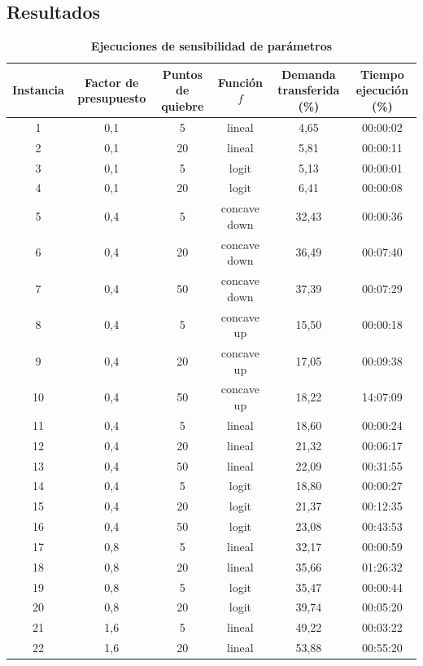 \documentclass{article}
\begin{document}
  \subsection{Resultados}

  \begin{table}
    \centering
    \caption*{{\bf Ejecuciones de sensibilidad de parámetros}}
    \begin{tabular}{cccccc}
        \toprule
        Instancia & Factor de presupuesto & Puntos de quiebre & Función $f$ & Demanda transferida (\%) & Tiempo ejecución (\%) \\
        \midrule
        1 & 0,1 & 5 & lineal & 4,65 & 00:00:02 \\
        2 & 0,1 & 20 & lineal & 5,81 & 00:00:11 \\
        3 & 0,1 & 5 & logit & 5,13 & 00:00:01 \\
        4 & 0,1 & 20 & logit & 6,41 & 00:00:08 \\
        5 & 0,4 & 5 & concave down & 32,43 & 00:00:36 \\
        6 & 0,4 & 20 & concave down & 36,49 & 00:07:40 \\
        7 & 0,4 & 50 & concave down & 37,39 & 00:07:29 \\
        8 & 0,4 & 5 & concave up & 15,50 & 00:00:18 \\
        9 & 0,4 & 20 & concave up & 17,05 & 00:09:38 \\
        10 & 0,4 & 50 & concave up & 18,22 & 14:07:09 \\
        11 & 0,4 & 5 & lineal & 18,60 & 00:00:24 \\
        12 & 0,4 & 20 & lineal & 21,32 & 00:06:17 \\
        13 & 0,4 & 50 & lineal & 22,09 & 00:31:55 \\
        14 & 0,4 & 5 & logit & 18,80 & 00:00:27 \\
        15 & 0,4 & 20 & logit & 21,37 & 00:12:35 \\
        16 & 0,4 & 50 & logit & 23,08 & 00:43:53 \\
        17 & 0,8 & 5 & lineal & 32,17 & 00:00:59 \\
        18 & 0,8 & 20 & lineal & 35,66 & 01:26:32 \\
        19 & 0,8 & 5 & logit & 35,47 & 00:00:44 \\
        20 & 0,8 & 20 & logit & 39,74 & 00:05:20 \\
        21 & 1,6 & 5 & lineal & 49,22 & 00:03:22 \\
        22 & 1,6 & 20 & lineal & 53,88 & 00:55:20 \\

\end{tabular}
\end{table}
\end{document}
